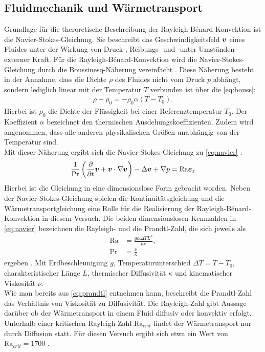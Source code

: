 \subsection{Fluidmechanik und Wärmetransport}
Grundlage für die theroretische Beschreibung der Rayleigh-B\'enard-Konvektion ist die Navier-Stokes-Gleichung. Sie beschreibt das Geschwindigkeitsfeld $\boldsymbol v$ eines Fluides unter der Wirkung von Druck-, Reibungs- und -unter Umständen- externer Kraft.
Für die Rayleigh-B\'enard-Konvektion wird die Navier-Stokes-Gleichung durch die Boussinesq-Näherung vereinfacht \cite{tritton}.
Diese Näherung besteht in der Annahme, dass die Dichte $\rho$ des Fluides nicht vom Druck $p$ abhängt, sondern lediglich linear mit der Temperatur $T$ verbunden ist über die \cref{eq:bouss}:
\begin{align}
\rho-\rho_0 = -\rho_0\alpha(T-T_0). \label{eq:bouss}
\end{align}
Hierbei ist $\rho_0$ die Dichte der Flüssigkeit bei einer Referenztemperatur $T_0$. Der Koeffizient $\alpha$ bezeichnet den thermischen Ausdehungskoeffizienten. Zudem wird angenommen, dass alle anderen physikalischen Größen unabhängig von der Temperatur sind.
\\
Mit dieser Näherung ergibt sich die Navier-Stokes-Gleichung zu \cref{eq:navier} \cite{Structures}:
\begin{align}
\frac{1}{\text{Pr}}\left(\frac{\partial}{\partial t} \boldsymbol v + \boldsymbol v \cdot \nabla \boldsymbol v \right) -\Delta \boldsymbol v + \nabla p = \text{Ra} \boldsymbol e_z \label{eq:navier}
\end{align}
Hierbei ist die Gleichung in eine dimensionslose Form gebracht worden. 
Neben der Navier-Stokes-Gleichung spielen die Kontinuitätsgleichung und die Wärmetransportgleichung eine Rolle für die Realisierung der Rayleigh-B\'enard-Konvektion in diesem Versuch. 
Die beiden dimensionslosen Kennzahlen in \cref{eq:navier} bezeichnen die Rayleigh- und die Prandtl-Zahl, die sich jeweils als 
\begin{align}
	\text{Ra} &= \frac{g\alpha\Delta T L^3}{\kappa\nu} \label{eq:rayleigh}, \\
	\text{Pr} &= \frac{\nu}{\kappa} \label{eq:prandtl}
\end{align}
ergeben \cite{Structures}. Mit Erdbeschleunigung $g$, Temperaturunterschied $\Delta T = T-T_0$, charakteristischer Länge $L$, thermischer Diffusivität $\kappa$ und kinematischer Viskosität $\nu$.
\\
Wie man bereits aus \cref{eq:prandtl} entnehmen kann, beschreibt die Prandtl-Zahl das Verhältnis von Viskosität zu Diffusivität. Die Rayleigh-Zahl gibt Aussage darüber ob der Wärmetransport in einem Fluid diffusiv oder konvektiv erfolgt. Unterhalb einer kritischen Rayleigh-Zahl $\text{Ra}_{crit}$ findet der Wärmetransport nur durch Diffusion statt. Für diesen Versuch ergibt sich etwa ein Wert von $\text{Ra}_{crit} = 1700$ \cite{Racrit}.
